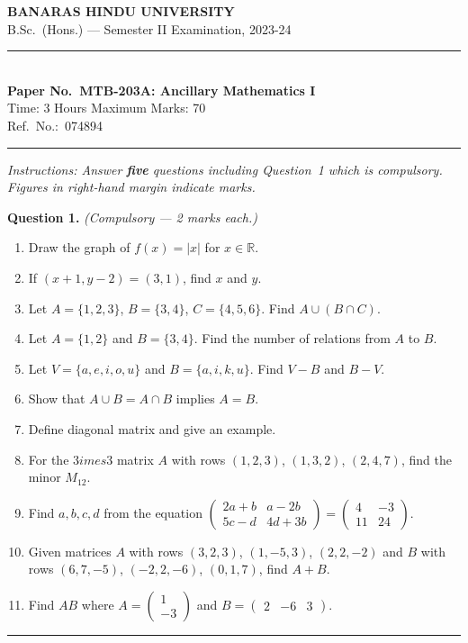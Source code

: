 \documentclass[11pt,a4paper]{article}
\begin{document}
\begin{center}
  {\large\bfseries BANARAS HINDU UNIVERSITY}\\[2pt]
  {\normalsize B.Sc.\ (Hons.) --- Semester II Examination, 2023-24}\\[6pt]
  \rule{0.8\linewidth}{0.5pt}\\[6pt]
  {\large\bfseries Paper No.\ MTB-203A: Ancillary Mathematics I}\\[4pt]
  {\normalsize Time: 3 Hours \hfill Maximum Marks: 70}\\[2pt]
  {\small Ref.\ No.:\ 074894}
\end{center}
\rule{\linewidth}{0.4pt}
\smallskip



\noindent   \textit{Instructions: Answer   \textbf{five} questions including Question~1 which is compulsory. Figures in right-hand margin indicate marks.}
\bigskip




\noindent   \textbf{Question 1.}   \textit{(Compulsory --- 2 marks each.)}

\begin{enumerate}[label=(\alph*),leftmargin=*,itemsep=5pt,topsep=3pt]
  \item Draw the graph of $f(x)=|x|$ for $x\in\mathbb{R}$.
  \item If $(x+1,y-2)=(3,1)$, find $x$ and $y$.
  \item Let $A=\{1,2,3\}$, $B=\{3,4\}$, $C=\{4,5,6\}$. Find $A\cup(B\cap C)$.
  \item Let $A=\{1,2\}$ and $B=\{3,4\}$. Find the number of relations from $A$ to $B$.
  \item Let $V=\{a,e,i,o,u\}$ and $B=\{a,i,k,u\}$. Find $V-B$ and $B-V$.
  \item Show that $A\cup B=A\cap B$ implies $A=B$.
  \item Define diagonal matrix and give an example.
  \item For the $3 imes3$ matrix $A$ with rows $(1,2,3)$, $(1,3,2)$, $(2,4,7)$, find the minor $M_{12}$.
  \item Find $a,b,c,d$ from the equation $
\begin{pmatrix}2a+b & a-2b\\5c-d & 4d+3b\end{pmatrix}=
\begin{pmatrix}4&-3\\11&24\end{pmatrix}$.
  \item Given matrices $A$ with rows $(3,2,3)$, $(1,-5,3)$, $(2,2,-2)$ and $B$ with rows $(6,7,-5)$, $(-2,2,-6)$, $(0,1,7)$, find $A+B$.
  \item Find $AB$ where $A=
\begin{pmatrix}1\\-3\end{pmatrix}$ and $B=
\begin{pmatrix}2&-6&3\end{pmatrix}$.
\end{enumerate}
\medskip\rule{\linewidth}{0.2pt}
\end{document}
